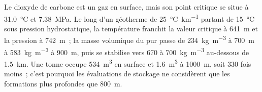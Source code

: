 Le dioxyde de carbone est un gaz en surface, mais son point critique se situe à \qty{31.0}{\celsius} et
\qty{7.38}{MPa}. Le long d'un géotherme de \qty{25}{\celsius\per\km} partant de \qty{15}{\celsius} sous pression hydrostatique, la température
franchit la valeur critique à \qty{641}{m} et la pression à
\qty{742}{m}~; la masse volumique du  pur passe de \qty{234}{kg.m^{-3}} à \qty{700}{m} à
\qty{583}{kg.m^{-3}} à \qty{900}{m}, puis se stabilise vers 670 à \qty{700}{kg.m^{-3}} au-dessous de
\qty{1.5}{km}. Une tonne occupe \qty{534}{m^3} en surface et \qty{1.6}{m^3} à \qty{1000}{m},
soit 330 fois moins~; c'est pourquoi les évaluations de stockage ne considèrent que les formations plus profondes que
\qty{800}{m}.

